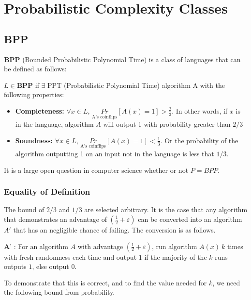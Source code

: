 \documentclass[11pt]{article}
\begin{document}
\section{Probabilistic Complexity Classes}
\subsection{BPP}
\textbf{BPP} (Bounded Probabilistic Polynomial Time) is a class of languages that can be defined as follows:
\vspace{1em}

$L \in \textbf{BPP}$ if $\exists$ PPT (Probabilistic Polynomial Time) algorithm A with the following properties:
\begin{itemize}
    \item \textbf{Completeness:} $\forall x \in L$, $\underset{\text{A's coinflips}}{Pr}$$[A(x) = 1] > \frac{2}{3}$. In other words, if $x$ is in the language, algorithm $A$ will output 1 with probability greater than $2/3$
    \item \textbf{Soundness:} $\forall x \in L$, $\underset{\text{A's coinflips}}{Pr}$$[A(x) = 1] < \frac{1}{3}$. Or the probability of the algorithm outputting 1 on an input not in the language is less that $1/3$.
\end{itemize}
It is a large open question in computer science whether or not $P = BPP$.
\subsubsection{Equality of Definition}
The bound of $2/3$ and $1/3$ are selected arbitrary. It is the case that any algorithm that demonstrates an advantage of $(\frac{1}{2} + \varepsilon)$ can be converted into an algorithm $A'$ that has an negligible chance of failing. The conversion is as follows.
\vspace{1em}

$\textbf{A'}$ : For an algorithm $A$ with advantage $(\frac{1}{2} + \varepsilon)$, run algorithm $A(x) \ k$ times with fresh randomness each time and output $1$ if the majority of the $k$ runs outputs $1$, else output $0$.
\vspace{1em}

To demonstrate that this is correct, and to find the value needed for $k$, we need the following bound from probability.
\vspace{1em}
\end{document}
